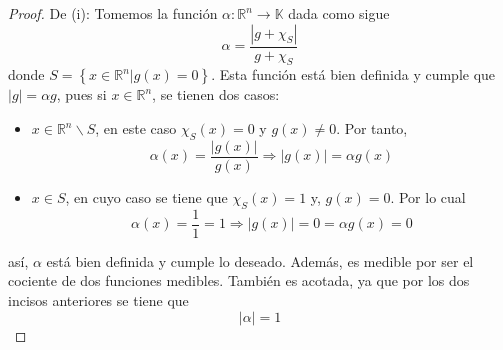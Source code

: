\documentclass[12pt]{report}
\newcounter{it}
\theoremstyle{largebreak}
\newcommand\abs[1]{\ensuremath{\left|#1\right|}}
\newcommand\cf[3]{\ensuremath{#1:#2\rightarrow#3}}
\begin{document}
    \begin{proof}
        De (i): Tomemos la función $\cf{\alpha}{\mathbb{R}^n}{\mathbb{K}}$ dada como sigue
        \begin{equation*}
            \alpha=\frac{\abs{g+\chi_S}}{g+\chi_S}
        \end{equation*}
        donde $S=\left\{x\in\mathbb{R}^n\Big|g(x)=0 \right\}$. Esta función está bien definida y cumple que $\abs{g}=\alpha g$, pues si $x\in\mathbb{R}^n$, se tienen dos casos:
        \begin{itemize}
            \item $x\in\mathbb{R}^n\backslash S$, en este caso $\chi_S(x)=0$ y $g(x)\neq0$. Por tanto,
            \begin{equation*}
                \alpha(x)=\frac{\abs{g(x)}}{g(x)}\Rightarrow \abs{g(x)}=\alpha g(x)
            \end{equation*}
            \item $x\in S$, en cuyo caso se tiene que $\chi_S(x)=1$ y, $g(x)=0$. Por lo cual
            \begin{equation*}
                \alpha(x)=\frac{1}{1}=1\Rightarrow\abs{g(x)}=0=\alpha g(x)=0
            \end{equation*}
        \end{itemize}
        así, $\alpha$ está bien definida y cumple lo deseado. Además, es medible por ser el cociente de dos funciones medibles. También es acotada, ya que por los dos incisos anteriores se tiene que
        \begin{equation*}
            \abs{\alpha}=1
        \end{equation*}


\end{proof}
\end{document}
